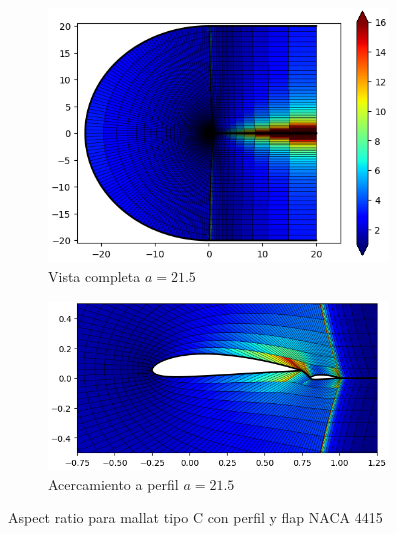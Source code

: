 \documentclass[letterpaper, openright, 12pt]{book}
\begin{document}
\begin{figure}[htbp!]
\begin{subfigure}[c]{0.48\textwidth}
            \includegraphics[keepaspectratio, width=0.99\textwidth]
                {./img/naca4415_c_flap_aa_215_aspect_far}
            \caption{Vista completa $a = 21.5$}
            \label{fig:naca4415_c_flap_aa_215_aspect_far}
        \end{subfigure}
        \hfill
        \begin{subfigure}[c]{0.48\textwidth}
            \includegraphics[keepaspectratio, width=0.99\textwidth]
                {./img/naca4415_c_flap_aa_215_aspect_close}
            \caption{Acercamiento a perfil $a = 21.5$}
            \label{fig:naca4415_c_flap_aa_215_aspect_close}
        \end{subfigure}
        \caption{Aspect ratio para mallat tipo C con perfil y flap NACA 4415}
        \label{fig:naca4415_c_flap_aspect_1}
    \end{figure}
\end{document}
